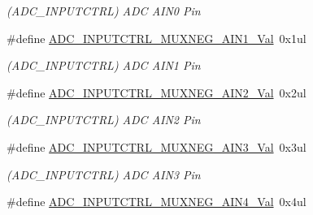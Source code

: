 \begin{DoxyCompactItemize}
\begin{DoxyCompactList}\small\item\em (A\+D\+C\+\_\+\+I\+N\+P\+U\+T\+C\+T\+R\+L) A\+D\+C A\+I\+N0 Pin \end{DoxyCompactList}\item 
\hypertarget{group___s_a_m_l21___a_d_c_ga65c4031252e29b801ab725e831297c7f}{}\#define \hyperlink{group___s_a_m_l21___a_d_c_ga65c4031252e29b801ab725e831297c7f}{A\+D\+C\+\_\+\+I\+N\+P\+U\+T\+C\+T\+R\+L\+\_\+\+M\+U\+X\+N\+E\+G\+\_\+\+A\+I\+N1\+\_\+\+Val}~0x1ul\label{group___s_a_m_l21___a_d_c_ga65c4031252e29b801ab725e831297c7f}

\begin{DoxyCompactList}\small\item\em (A\+D\+C\+\_\+\+I\+N\+P\+U\+T\+C\+T\+R\+L) A\+D\+C A\+I\+N1 Pin \end{DoxyCompactList}\item 
\hypertarget{group___s_a_m_l21___a_d_c_ga09e7cbeacb0e375e6e11b4b411581ab2}{}\#define \hyperlink{group___s_a_m_l21___a_d_c_ga09e7cbeacb0e375e6e11b4b411581ab2}{A\+D\+C\+\_\+\+I\+N\+P\+U\+T\+C\+T\+R\+L\+\_\+\+M\+U\+X\+N\+E\+G\+\_\+\+A\+I\+N2\+\_\+\+Val}~0x2ul\label{group___s_a_m_l21___a_d_c_ga09e7cbeacb0e375e6e11b4b411581ab2}

\begin{DoxyCompactList}\small\item\em (A\+D\+C\+\_\+\+I\+N\+P\+U\+T\+C\+T\+R\+L) A\+D\+C A\+I\+N2 Pin \end{DoxyCompactList}\item 
\hypertarget{group___s_a_m_l21___a_d_c_ga7e31bc15fe6f1320232a1c6e96082094}{}\#define \hyperlink{group___s_a_m_l21___a_d_c_ga7e31bc15fe6f1320232a1c6e96082094}{A\+D\+C\+\_\+\+I\+N\+P\+U\+T\+C\+T\+R\+L\+\_\+\+M\+U\+X\+N\+E\+G\+\_\+\+A\+I\+N3\+\_\+\+Val}~0x3ul\label{group___s_a_m_l21___a_d_c_ga7e31bc15fe6f1320232a1c6e96082094}

\begin{DoxyCompactList}\small\item\em (A\+D\+C\+\_\+\+I\+N\+P\+U\+T\+C\+T\+R\+L) A\+D\+C A\+I\+N3 Pin \end{DoxyCompactList}\item 
\hypertarget{group___s_a_m_l21___a_d_c_ga152c475597bce7f68aaf5844e5c9c1b2}{}\#define \hyperlink{group___s_a_m_l21___a_d_c_ga152c475597bce7f68aaf5844e5c9c1b2}{A\+D\+C\+\_\+\+I\+N\+P\+U\+T\+C\+T\+R\+L\+\_\+\+M\+U\+X\+N\+E\+G\+\_\+\+A\+I\+N4\+\_\+\+Val}~0x4ul\label{group___s_a_m_l21___a_d_c_ga152c475597bce7f68aaf5844e5c9c1b2}


\end{DoxyCompactItemize}
